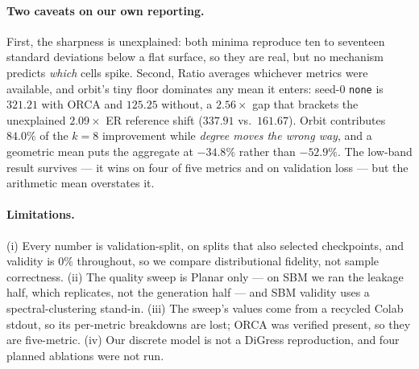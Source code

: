 \documentclass[11pt]{article}
\begin{document}
\paragraph{Two caveats on our own reporting.} First, the sharpness is unexplained: both minima reproduce ten to seventeen standard deviations
below a flat surface, so they are real, but no mechanism predicts \emph{which} cells spike.
Second, Ratio averages whichever metrics were available, and orbit's tiny
floor dominates any mean it enters: seed-0 \texttt{none} is $321.21$ with ORCA and $125.25$
without, a $2.56\times$ gap that brackets the unexplained $2.09\times$ ER reference shift
($337.91$ vs.\ $161.67$). Orbit contributes $84.0\%$ of the $k{=}8$ improvement while \emph{degree
moves the wrong way}, and a geometric mean puts the aggregate at $-34.8\%$ rather than $-52.9\%$.
The low-band result survives --- it wins on four of five metrics and on validation loss --- but
the arithmetic mean overstates it.

\paragraph{Limitations.} (i) Every number is validation-split, on splits that also selected
checkpoints, and validity is $0\%$ throughout, so we compare distributional fidelity, not sample
correctness. (ii) The quality sweep is Planar only --- on SBM we ran the leakage half, which
replicates, not the generation half --- and SBM validity uses a spectral-clustering stand-in.
(iii) The sweep's values come from a recycled Colab stdout, so its per-metric
breakdowns are lost; ORCA was verified present, so they are five-metric. (iv) Our
discrete model is not a DiGress reproduction, and four planned ablations were not run.



\end{document}
